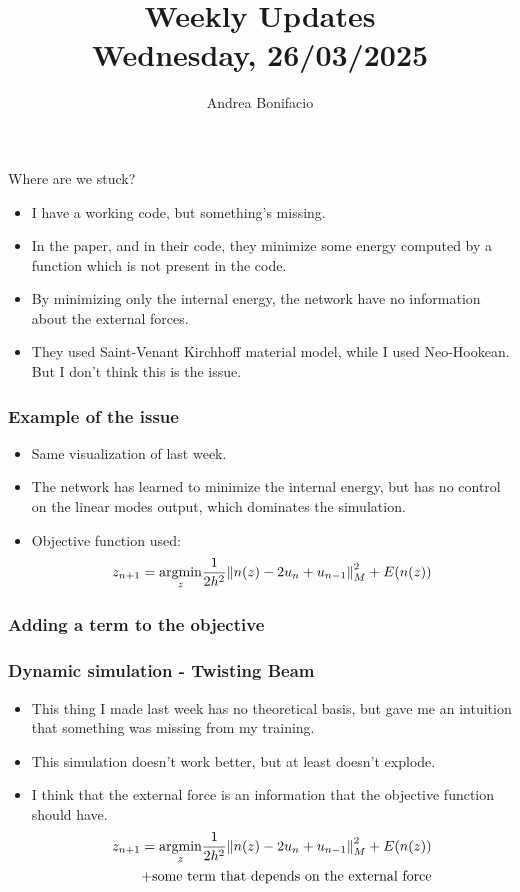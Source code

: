 \documentclass{beamer}
\title{Weekly Updates\\
\tiny{Wednesday, 26/03/2025}}
\author{Andrea Bonifacio}
\date{}
\DeclareMathOperator{\argmin}{argmin}
\begin{document}
\begin{frame}
\titlepage
\end{frame}


\begin{frame}{Where are we stuck?}
    \begin{itemize}
        \item I have a working code, but something's missing.
        \item In the paper, and in their code, they minimize some energy computed by a function which is not present in the code.
        \item By minimizing only the internal energy, the network have no information about the external forces.
        \item They used Saint-Venant Kirchhoff material model, while I used Neo-Hookean. But I don't think this is the issue.
    \end{itemize}
\end{frame}


\begin{frame}
    \frametitle{Example of the issue}
    \begin{itemize}
        \item Same visualization of last week.
        \item The network has learned to minimize the internal energy, but has no control on the linear modes output, which dominates the simulation.
        \item Objective function used:
        \[
              z_{n+1} = \underset{z}{\argmin}  \frac{1}{2h^2} \norm{n(z) - 2u_n + u_{n-1}}^2_M + E(n(z))
        \]
    \end{itemize}
\end{frame}

\begin{frame}
    \frametitle{Adding a term to the objective}
    \begin{center}
    \end{center}
\end{frame}

\begin{frame}
    \frametitle{Dynamic simulation - Twisting Beam}
    \begin{itemize}
        \item This thing I made last week has no theoretical basis, but gave me an intuition that something was missing from my training.
        \item This simulation doesn't work better, but at least doesn't explode.
        \item I think that the external force is an information that the objective function should have.
        \[
            \begin{split}
                z_{n+1} = \underset{z}{\argmin}  \frac{1}{2h^2} \norm{n(z) - 2u_n + u_{n-1}}^2_M + E(n(z)) \\ + \text{some term that depends on the external force}
            \end{split}
        \]
    \end{itemize}
\end{frame}
\end{document}
